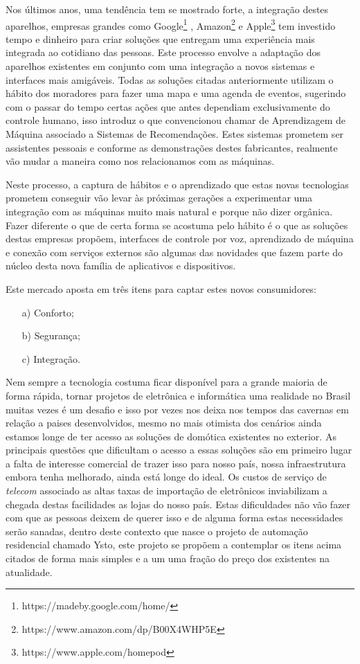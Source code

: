 Nos últimos anos, uma tendência tem se mostrado forte, a integração destes aparelhos, empresas grandes como Google\footnote{https://madeby.google.com/home/} , Amazon\footnote{https://www.amazon.com/dp/B00X4WHP5E} e Apple\footnote{https://www.apple.com/homepod} tem investido tempo e dinheiro para criar soluções que entregam uma experiência mais integrada ao cotidiano das pessoas. Este processo envolve a adaptação dos aparelhos existentes em conjunto com uma integração a novos sistemas e interfaces mais amigáveis. Todas as soluções citadas anteriormente utilizam o hábito dos moradores para fazer uma mapa e uma agenda de eventos, sugerindo com o passar do tempo certas ações que antes dependiam exclusivamente do controle humano, isso introduz o que convencionou chamar de Aprendizagem de Máquina associado a Sistemas de Recomendações. Estes sistemas prometem ser assistentes pessoais e conforme as demonstrações destes fabricantes, realmente vão mudar a maneira como nos relacionamos com as máquinas.

Neste processo, a captura de hábitos e o aprendizado que estas novas tecnologias prometem conseguir vão levar às próximas gerações a experimentar uma integração com as máquinas muito mais natural e porque não dizer orgânica. Fazer diferente o que de certa forma se acostuma pelo hábito é o que as soluções destas empresas propõem, interfaces de controle por voz, aprendizado de máquina e conexão com serviços externos são algumas das novidades que fazem parte do núcleo desta nova família de aplicativos e dispositivos.

Este mercado aposta em três itens para captar estes novos consumidores:
\begin{itemize}
    \item[a)] Conforto;
    \item[b)] Segurança;
    \item[c)] Integração.
\end{itemize}

Nem sempre a tecnologia costuma ficar disponível para a grande maioria de forma rápida, tornar projetos de eletrônica e informática uma realidade no Brasil muitas vezes é um desafio e isso por vezes nos deixa nos tempos das cavernas em relação a paises desenvolvidos, mesmo no mais otimista dos cenários ainda estamos longe de ter acesso as soluções de domótica existentes no exterior. As principais questões que dificultam o acesso a essas soluções são em primeiro lugar a falta de interesse comercial de trazer isso para nosso país, nossa infraestrutura embora tenha melhorado, ainda está longe do ideal. Os custos de serviço de \textit{telecom} associado as altas taxas de importação de eletrônicos inviabilizam a chegada destas facilidades as lojas do nosso país.
Estas dificuldades não vão fazer com que as pessoas deixem de querer isso e de alguma forma estas necessidades serão sanadas, dentro deste contexto que nasce o projeto de automação residencial chamado Ysto, este projeto se propõem a contemplar os itens acima citados de forma mais simples e a um uma fração do preço dos existentes na atualidade.

